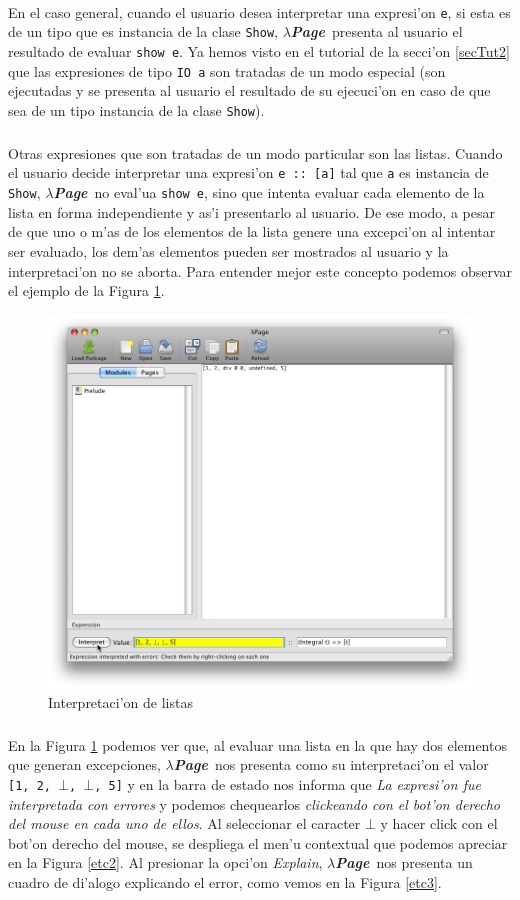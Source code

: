 \documentclass[a4paper]{article}
\newcommand{\hpage}{\textbf{\textsl{$\lambda$Page}}}
\begin{document}
\paragraph{}En el caso general, cuando el usuario desea interpretar una expresi'on \texttt{e}, si esta es de un tipo que es instancia de la clase \texttt{Show}, \hpage\ presenta al usuario el resultado de evaluar \texttt{show e}.  Ya hemos visto en el tutorial de la secci'on \ref{secTut2} que las expresiones de tipo \texttt{IO a} son tratadas de un modo especial (son ejecutadas y se presenta al usuario el resultado de su ejecuci'on en caso de que sea de un tipo instancia de la clase \texttt{Show}).
\subparagraph{}Otras expresiones que son tratadas de un modo particular son las listas.  Cuando el usuario decide interpretar una expresi'on \texttt{e :: [a]} tal que \texttt{a} es instancia de \texttt{Show}, \hpage\ no eval'ua \texttt{show e}, sino que intenta evaluar cada elemento de la lista en forma independiente y as'i presentarlo al usuario.  De ese modo, a pesar de que uno o m'as de los elementos de la lista genere una excepci'on al intentar ser evaluado, los dem'as elementos pueden ser mostrados al usuario y la interpretaci'on no se aborta.  Para entender mejor este concepto podemos observar el ejemplo de la Figura \ref{etc1}.
\begin{figure}[hp]
	\begin{center}
        	\includegraphics[width=.75\textwidth]{pictures/lists01}
		\caption{Interpretaci'on de listas}
		\label{etc1}
	\end{center}
\end{figure}
\subparagraph{}En la Figura \ref{etc1} podemos ver que, al evaluar una lista en la que hay dos elementos que generan excepciones, \hpage\ nos presenta como su interpretaci'on el valor \texttt{[1, 2, $\bot$, $\bot$, 5]} y en la barra de estado nos informa que \textit{La expresi'on fue interpretada con errores} y podemos chequearlos \textit{clickeando con el bot'on derecho del mouse en cada uno de ellos}.  Al seleccionar el caracter \texttt{$\bot$} y hacer click con el bot'on derecho del mouse, se despliega el men'u contextual que podemos apreciar en la Figura \ref{etc2}. Al presionar la opci'on \textsl{Explain}, \hpage\ nos presenta un cuadro de di'alogo explicando el error, como vemos en la Figura \ref{etc3}.
\end{document}
